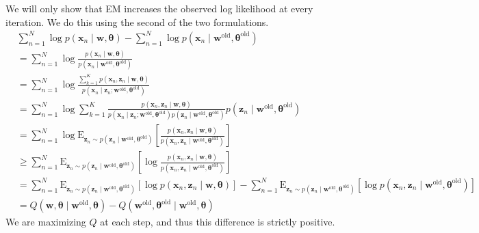 We will only show that EM increases the observed log likelihood at every iteration. We do this using the second of the two formulations.
\begin{align*}
    &\sum_{n = 1} ^N \log p(\mathbf{x}_n \mid \mathbf{w}, \boldsymbol{\theta}) - \sum_{n = 1} ^N \log p(\mathbf{x}_n \mid \mathbf{w}^\text{old}, \boldsymbol{\theta}^\text{old}) \\
    &= \sum_{n = 1} ^N \log \frac{p(\mathbf{x}_n \mid \mathbf{w}, \boldsymbol{\theta})}{p(\mathbf{x}_n \mid \mathbf{w}^\text{old}, \boldsymbol{\theta}^\text{old})} \\
    &= \sum_{n = 1} ^N \log \frac{\sum_{k = 1} ^K p(\mathbf{x}_n, \mathbf{z}_n \mid \mathbf{w}, \boldsymbol{\theta})}{p(\mathbf{x}_n \mid \mathbf{z}_n; \mathbf{w}^\text{old}, \boldsymbol{\theta}^\text{old})} \\
    &= \sum_{n = 1} ^N \log \sum_{k = 1} ^K \frac{p(\mathbf{x}_n, \mathbf{z}_n \mid \mathbf{w}, \boldsymbol{\theta})}{p(\mathbf{x}_n \mid \mathbf{z}_n; \mathbf{w}^\text{old}, \boldsymbol{\theta}^\text{old})p(\mathbf{z}_n \mid \mathbf{w}^\text{old}, \boldsymbol{\theta}^\text{old})} p(\mathbf{z}_n \mid \mathbf{w}^\text{old}, \boldsymbol{\theta}^\text{old}) \\
    &= \sum_{n = 1} ^N \log \mathrm{E}_{\mathbf{z}_n \sim p(\mathbf{z}_n \mid \mathbf{w}^\text{old}, \boldsymbol{\theta}^\text{old})} \left[ \frac{p(\mathbf{x}_n, \mathbf{z}_n \mid \mathbf{w}, \boldsymbol{\theta})}{p(\mathbf{x}_n, \mathbf{z}_n \mid \mathbf{w}^\text{old}, \boldsymbol{\theta}^\text{old})} \right] \\
    &\geq \sum_{n =1} ^N \mathrm{E}_{\mathbf{z}_n \sim p(\mathbf{z}_n \mid \mathbf{w}^\text{old}, \boldsymbol{\theta}^\text{old})} \left[ \log \frac{p(\mathbf{x}_n, \mathbf{z}_n \mid \mathbf{w}, \boldsymbol{\theta})}{p(\mathbf{x}_n, \mathbf{z}_n \mid \mathbf{w}^\text{old}, \boldsymbol{\theta}^\text{old})} \right] \\
    &= \sum_{n =1} ^N \mathrm{E}_{\mathbf{z}_n \sim p(\mathbf{z}_n \mid \mathbf{w}^\text{old}, \boldsymbol{\theta}^\text{old})} \left[ \log p(\mathbf{x}_n, \mathbf{z}_n \mid \mathbf{w}, \boldsymbol{\theta}) \right] - \sum_{n =1} ^N \mathrm{E}_{\mathbf{z}_n \sim p(\mathbf{z}_n \mid \mathbf{w}^\text{old}, \boldsymbol{\theta}^\text{old})} \left[ \log p(\mathbf{x}_n, \mathbf{z}_n \mid \mathbf{w}^\text{old}, \boldsymbol{\theta}^\text{old}) \right] \\
    &= Q(\mathbf{w}, \boldsymbol{\theta} \mid \mathbf{w}^\text{old}, \boldsymbol{\theta}) - Q(\mathbf{w}^\text{old}, \boldsymbol{\theta}^\text{old} \mid \mathbf{w}^\text{old}, \boldsymbol{\theta})
\end{align*}
We are maximizing $Q$ at each step, and thus this difference is strictly positive. 

